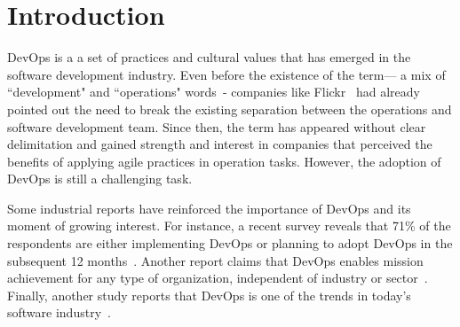 \section{Introduction}

DevOps is a a set of practices and cultural values that has emerged in the
software development industry. Even before
the existence of the term--- a mix of ``development" and ``operations"
words~\cite{httermann2012devops}- companies like Flickr~\cite{flickr}
had already pointed out the need to break the existing separation between
the operations and software development team. Since then, the term
has appeared without clear delimitation and gained strength and interest
in companies that perceived the benefits of applying agile practices in operation
tasks.
However, the adoption of DevOps is still a challenging
task.


Some industrial reports have reinforced the importance of DevOps and its moment
of growing interest. For instance, a recent survey reveals 
that 71\% of the respondents are either implementing DevOps or
planning to adopt DevOps in the subsequent 12 months~\cite{state_of_agile}.
Another report claims that DevOps enables mission achievement
for any type of organization, independent of industry or sector~\cite{state_of_devops}.  
Finally, another study reports that DevOps is one of the trends in
today's software industry~\cite{stackoverflow_2018}.

